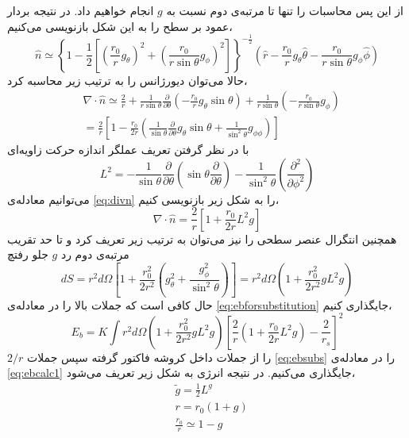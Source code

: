از این پس محاسبات را تنها تا مرتبه‌ی دوم نسبت به $g$ 
انجام خواهیم داد. در نتیجه بردار عمود بر سطح را به این شکل بازنویسی می‌کنیم،
\begin{equation}
\hat n \simeq\left\{1-\frac{1}{2}\left[\left(\frac{r_0}{r}g_\theta\right)^2+\left(\frac{r_0}{r\sin\theta}g_\phi\right)^2 \right]\right\}^{-\frac{1}{2}}\left( \hat r-\frac{r_0}{r}g_\theta \hat\theta-\frac{r_0}{r\sin\theta}g_\phi\hat\phi \right)
\end{equation}
حالا می‌توان دیورژانس را به ترتیب زیر محاسبه کرد،
\begin{equation}
\begin{aligned}
&\nabla\cdot\hat n \simeq \frac{2}{r}+\frac{1}{r\sin\theta}\frac{\partial}{\partial\theta}\left(-\frac{r_0}{r}g_\theta\sin\theta\right)+\frac{1}{r\sin\theta}\left(-\frac{r_0}{r\sin\theta}g_\phi\right)\\
&=\frac{2}{r}\left[1-\frac{r_0}{2r}\left(\frac{1}{\sin\theta}\frac{\partial}{\partial\theta}g_\theta\sin\theta+\frac{1}{\sin^2\theta}g_{\phi\phi}\right)\right]
\label{eq:divn}
\end{aligned}
\end{equation}
با در نظر گرفتن تعریف عملگر اندازه حرکت زاویه‌ای 
\begin{equation}
L^2=-\frac{1}{\sin\theta}\frac{\partial}{\partial\theta}\left(\sin\theta\frac{\partial}{\partial\theta}\right)-\frac{1}{\sin^2\theta}\left(\frac{\partial^2}{\partial\phi^2}\right)
\end{equation}
می‌توانیم معادله‌ی
\ref{eq:divn}
را به شکل زیر بازنویسی کنیم،
\begin{equation}
\nabla\cdot\hat n =\frac{2}{r}\left[1+\frac{r_0}{2r}L^2g\right]
\label{eq:divnL2}
\end{equation}
همچنین انتگرال عنصر سطحی را نیز می‌توان به ترتیب زیر تعریف کرد و تا حد تقریب مرتبه‌ی دوم رد $g$ جلو رفتچ
\begin{equation}
dS=r^2d\Omega\left[1+\frac{r_0^2}{2r^2}\left(g_\theta^2+\frac{g_\phi^2}{\sin^2\theta}\right)\right]=r^2d\Omega\left(1+\frac{r_0^2}{2r^2}gL^2g\right)
\label{eq:dsL2}
\end{equation}
حال کافی است که جملات بالا را در معادله‌ی \ref{eq:ebforsubstitution} جایگذاری کنیم،
\begin{equation}
E_b=K\int r^2d\Omega\left(1+\frac{r_0^2}{2r^2}gL^2g\right)\left[\frac{2}{r}\left(1+\frac{r_0}{2r}L^2g\right)-\frac{2}{r_s}\right]^2
\label{eq:ebcalc1}
\end{equation}
 $2/r$ را از جملات داخل کروشه فاکتور گرفته سپس جملات 
 \ref{eq:ebsubs}
 را در معادله‌ی
 \ref{eq:ebcalc1}
 جایگذاری می‌کنیم‌. در نتیجه انرژی به شکل زیر تعریف می‌شود،
\begin{equation}
\begin{aligned}
&\tilde{g}=\frac{1}{2}L^g\\
&r=r_0(1+g)\\
&\frac{r_0}{r}\simeq 1-g
\label{eq:ebsubs}
\end{aligned}
\end{equation}


